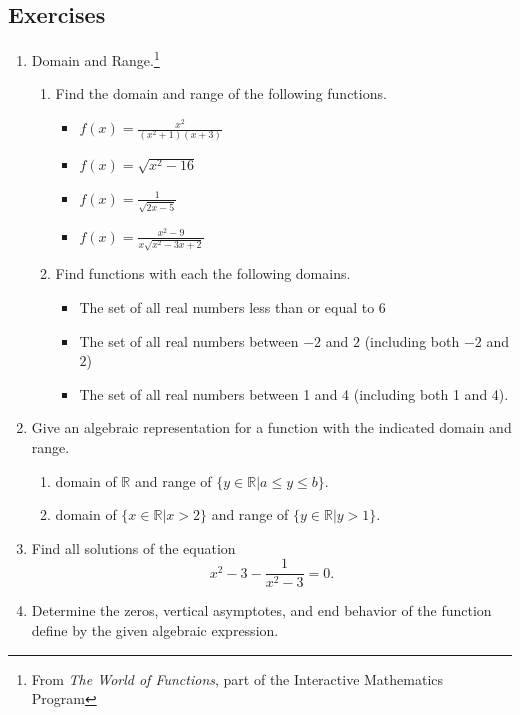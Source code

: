\documentclass[
]{book}
\providecommand{\tightlist}{%
  \setlength{\itemsep}{0pt}\setlength{\parskip}{0pt}}
\theoremstyle{definition}
\theoremstyle{definition}
\theoremstyle{definition}
\theoremstyle{definition}
\theoremstyle{remark}
\begin{document}
\hypertarget{exercises-35}{%
\subsection{Exercises}\label{exercises-35}}

\begin{enumerate}
\def\labelenumi{\arabic{enumi}.}
\item
  Domain and Range.\footnote{From \emph{The World of Functions}, part of the Interactive Mathematics Program}

  \begin{enumerate}
  \def\labelenumii{\alph{enumii}.}
  \tightlist
  \item
    Find the domain and range of the following functions.

    \begin{itemize}
    \tightlist
    \item
      \(\displaystyle{ f(x) =\frac{x^2}{(x^2+1)(x+3)}}\)
    \item
      \(\displaystyle{f(x)=\sqrt{x^2-16}}\)
    \item
      \(\displaystyle{f(x)=\frac{1}{\sqrt{2x-5}}}\)
    \item
      \(\displaystyle{f(x)= \frac{x^2-9}{x\sqrt{x^2-3x+2}}}\)
    \end{itemize}
  \item
    Find functions with each the following domains.

    \begin{itemize}
    \tightlist
    \item
      The set of all real numbers less than or equal to 6
    \item
      The set of all real numbers between \(-2\) and \(2\) (including both \(-2\) and \(2\))
    \item
      The set of all real numbers between 1 and 4 (including both 1 and 4).
    \end{itemize}
  \end{enumerate}
\item
  Give an algebraic representation for a function with the indicated domain and range.

  \begin{enumerate}
  \def\labelenumii{\alph{enumii}.}
  \tightlist
  \item
    domain of \(\mathbb{R}\) and range of \(\{y\in \mathbb{R}\vert a\leq y \leq b\}\).
  \item
    domain of \(\{x\in \mathbb{R}\vert x>2\}\) and range of \(\{y\in \mathbb{R}\vert y>1\}\).
  \end{enumerate}
\item
  Find all solutions of the equation
  \[x^2-3 - \frac{1}{x^2-3} = 0.\]
\item
  Determine the zeros, vertical asymptotes, and end behavior of the function define by the given algebraic expression.


\end{enumerate}
\end{document}
